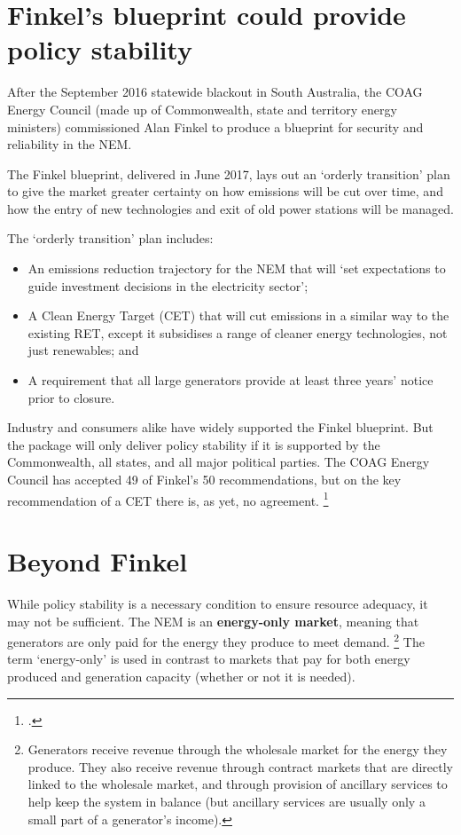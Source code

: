 \documentclass[FrontPage]{grattan}
\begin{document}
\section{Finkel's blueprint could provide policy stability}\label{sec:finkel-review-focused-on-security-and-reliability}
After the September 2016 statewide blackout in South Australia, the COAG Energy Council (made up of Commonwealth, state and territory energy ministers) commissioned Alan Finkel to produce a blueprint for security and reliability in the NEM\@.

The Finkel blueprint, delivered in June 2017, lays out an `orderly transition' plan to give the market greater certainty on how emissions will be cut over time, and how the entry of new technologies and exit of old power stations will be managed. 

The `orderly transition' plan includes:
\begin{itemize}
    \item An emissions reduction trajectory for the NEM that will `set expectations to guide investment decisions in the electricity sector';
    \item A Clean Energy Target (CET) that will cut emissions in a similar way to the existing RET, except it subsidises a range of cleaner energy technologies, not just renewables; and
    \item A requirement that all large generators provide at least three years' notice prior to closure.
\end{itemize}

Industry and consumers alike have widely supported the Finkel blueprint. But the package will only deliver policy stability if it is supported by the Commonwealth, all states, and all major political parties. The COAG Energy Council has accepted 49 of Finkel's 50 recommendations, but on the key recommendation of a CET there is, as yet, no agreement.%
\footcite{COAGEC2017JulyCommunique}


\section{Beyond Finkel}\label{sec:beyond-finkel}
While policy stability is a necessary condition to ensure resource adequacy, it may not be sufficient. The NEM is an \textbf{energy-only market}, meaning that generators are only paid for the energy they produce to meet demand.%
\footnote{Generators receive revenue through the wholesale market for the energy they produce. They also receive revenue through contract markets that are directly linked to the wholesale market, and through provision of ancillary services to help keep the system in balance (but ancillary services are usually only a small part of a generator's income).}
The term `energy-only' is used in contrast to markets that pay for both energy produced and generation capacity (whether or not it is needed).
\end{document}
